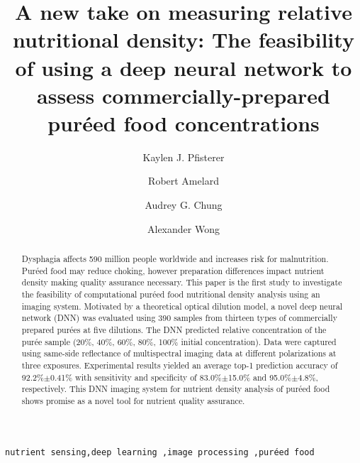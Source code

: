 \documentclass[authoryear]{elsarticle}
\begin{document}
\begin{frontmatter}

\title{A new take on measuring relative nutritional density: The feasibility of using a deep neural network to assess commercially-prepared pur\' eed food concentrations}


\author[mymainaddress,secondaddress]{Kaylen J. Pfisterer }

\author[mymainaddress,secondaddress]{Robert Amelard}
\author[mymainaddress]{Audrey G. Chung}
\author[mymainaddress,secondaddress]{Alexander Wong}
\address[mymainaddress]{University of Waterloo, Department of Systems Design Engineering, N2L 3G1, Canada}
\address[secondaddress]{Schlegel-UW Research Institute for Aging, Waterloo, N2J 0E2, Canada}



\begin{abstract}
Dysphagia affects 590 million people worldwide and increases risk for malnutrition. Pur\' eed food may reduce choking, however preparation differences impact nutrient density making quality assurance necessary. This paper is the first study to investigate the feasibility of computational pur\' eed food nutritional density analysis using an imaging system. Motivated by a theoretical optical dilution model, a novel deep neural network (DNN) was evaluated using 390 samples from thirteen types of commercially prepared pur\' ees at five dilutions. The DNN predicted relative concentration of the pur\' ee sample (20\%, 40\%, 60\%, 80\%, 100\% initial concentration). Data were captured using same-side reflectance of multispectral imaging data at different polarizations at three exposures. Experimental results yielded an average top-1 prediction accuracy of 92.2\%$\pm$0.41\% with sensitivity and specificity of  83.0\%$\pm$15.0\% and 95.0\%$\pm$4.8\%, respectively. This DNN imaging system for nutrient density analysis of pur\' eed food shows promise as a novel tool for nutrient quality assurance.
\end{abstract}

\begin{keyword}
\texttt{nutrient sensing\sep deep learning \sep image processing \sep pur\' eed food}
\end{keyword}

\end{frontmatter}
\end{document}
